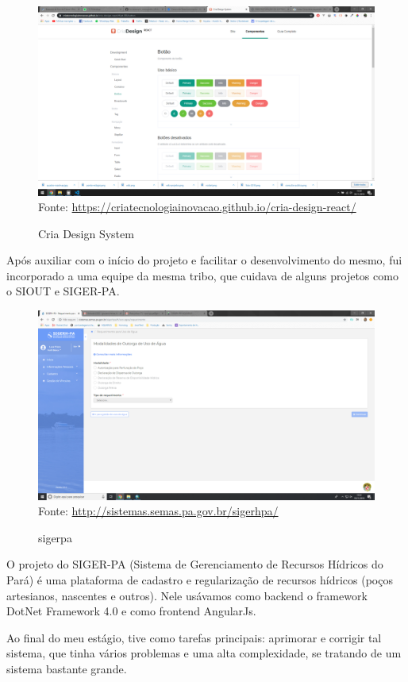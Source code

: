 \begin{figure}[H]
\centering
\caption{Cria Design System} %
\includegraphics[scale=0.3]{cria-design}\\  %
{\small Fonte: \url{https://criatecnologiainovacao.github.io/cria-design-react/}} %
\label{fig:exemplo} %
\end{figure}

Após auxiliar com o início do projeto e facilitar o desenvolvimento do mesmo, fui incorporado a uma equipe da mesma tribo, que cuidava de alguns projetos como o SIOUT e SIGER-PA.

\begin{figure}[H]
\centering
\caption{sigerpa} %
\includegraphics[scale=0.222]{sigerpa}\\  %
{\small Fonte: \url{http://sistemas.semas.pa.gov.br/sigerhpa/}} %
\label{fig:exemplo} %
\end{figure}

O projeto do SIGER-PA (Sistema de Gerenciamento de Recursos Hídricos do Pará) é uma plataforma de cadastro e regularização de recursos hídricos (poços artesianos, nascentes e outros).
Nele usávamos como backend o framework DotNet Framework 4.0 e como frontend AngularJs.

Ao final do meu estágio, tive como tarefas principais: aprimorar e corrigir tal sistema, que tinha
vários problemas e uma alta complexidade, se tratando de um sistema bastante grande.